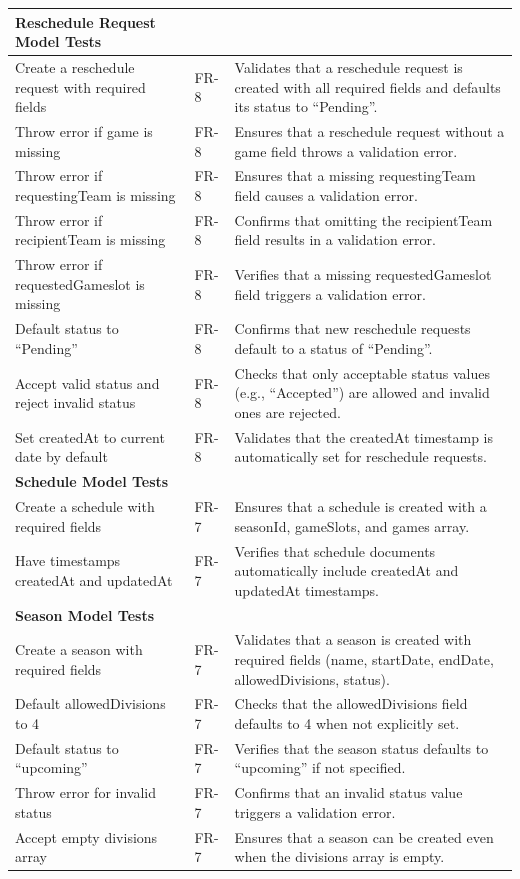 \documentclass[12pt, titlepage]{article}
\begin{document}
\begin{longtable}{|p{}|p{}|p{}|}
    \textbf{Reschedule Request Model Tests} & & \\ \hline
    Create a reschedule request with required fields & FR-8 & Validates that a reschedule request is created with all required fields and defaults its status to ``Pending''. \\ \hline
    Throw error if game is missing & FR-8 & Ensures that a reschedule request without a game field throws a validation error. \\ \hline
    Throw error if requestingTeam is missing & FR-8 & Ensures that a missing requestingTeam field causes a validation error. \\ \hline
    Throw error if recipientTeam is missing & FR-8 & Confirms that omitting the recipientTeam field results in a validation error. \\ \hline
    Throw error if requestedGameslot is missing & FR-8 & Verifies that a missing requestedGameslot field triggers a validation error. \\ \hline
    Default status to ``Pending'' & FR-8 & Confirms that new reschedule requests default to a status of ``Pending''. \\ \hline
    Accept valid status and reject invalid status & FR-8 & Checks that only acceptable status values (e.g., ``Accepted'') are allowed and invalid ones are rejected. \\ \hline
    Set createdAt to current date by default & FR-8 & Validates that the createdAt timestamp is automatically set for reschedule requests. \\ \hline
    
    \textbf{Schedule Model Tests} & & \\ \hline
    Create a schedule with required fields & FR-7 & Ensures that a schedule is created with a seasonId, gameSlots, and games array. \\ \hline
    Have timestamps createdAt and updatedAt & FR-7 & Verifies that schedule documents automatically include createdAt and updatedAt timestamps. \\ \hline
    
    \textbf{Season Model Tests} & & \\ \hline
    Create a season with required fields & FR-7 & Validates that a season is created with required fields (name, startDate, endDate, allowedDivisions, status). \\ \hline
    Default allowedDivisions to 4 & FR-7 & Checks that the allowedDivisions field defaults to 4 when not explicitly set. \\ \hline
    Default status to ``upcoming'' & FR-7 & Verifies that the season status defaults to ``upcoming'' if not specified. \\ \hline
    Throw error for invalid status & FR-7 & Confirms that an invalid status value triggers a validation error. \\ \hline
    Accept empty divisions array & FR-7 & Ensures that a season can be created even when the divisions array is empty. \\ \hline
    

\end{longtable}
\end{document}
